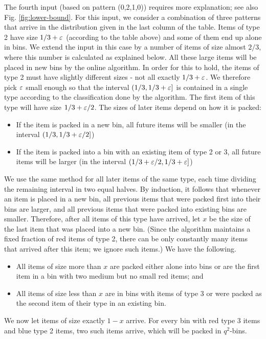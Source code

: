 The fourth input (based on pattern (0,2,1,0)) requires more explanation; see also Fig. \ref{fig:lower-bound}.
For this input, we consider a combination of three patterns that arrive in the distribution given in the last column of the table.
Items of type 2 have size $1/3+\varepsilon$ (according to the
table above) and some of them end up
alone in bins. We extend the input in this case by a number of items of size
almost $2/3$, where this number is 
calculated as explained below.
All these large items will be placed in new bins by the online algorithm.
In order for this to hold, the items of type 2 must have slightly different
sizes - not all exactly $1/3+\varepsilon$.
We therefore pick $\varepsilon$ small enough so that the interval
$(1/3,1/3+\varepsilon]$ is contained in a single type according to the classification
done by the algorithm. The first item of this type
will have size $1/3+\varepsilon/2$. The sizes of later items depend on how it is packed:
\begin{itemize}
	\item If the item is packed in a new bin, all future items
	will be smaller (in the interval $(1/3,1/3+\varepsilon/2]$)
	\item If the item is packed into a bin with an existing item of type 2 or 3,
	all future items will be larger (in the interval $(1/3+\varepsilon/2,1/3+\varepsilon]$)
\end{itemize}
We use the same method for all later items of the same type, each time dividing the
remaining interval in two equal halves. 
By induction, it follows that whenever an item is placed in a new bin,
all previous items that were packed first into their bins are larger, and
all previous items that were packed into existing bins are smaller.
Therefore,
after all items of this type have arrived, let $x$ be the size of the last item
that was placed into a new bin. 
(Since the algorithm maintains a fixed fraction of red items of type 2,
there can be only constantly many items that arrived after this item; we ignore such
items.)
We have the following.
\begin{itemize}
	\item All items of size more than $x$ are packed either alone into bins or are the first item in a bin with two medium but no small red items; and 
	\item All items of size less than $x$ are in bins with items of type 3 or were
	packed as the second item of their type in an existing bin.
\end{itemize}
We now let items of size exactly $1-x$ arrive. 
For every bin with red type 3 items and blue type 2 items, two such items arrive, which will be packed in $q^2$-bins.
